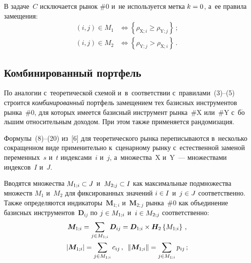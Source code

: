 \begin{multicols}{2}
  В задаче~$C$ исключается рынок \#0 и~не используется метка $k\hm = 0$, 
а~ее правила замещения: 
  \begin{align*}
  (i,j)\in M_1 &\Leftrightarrow \left\{ \rho_{\mathrm{X};i}\geq 
\rho_{\mathrm{Y};j}\right\}\,;\\
  (i,j) \in M_2 &\Leftrightarrow \left\{ \rho_{\mathrm{Y};j}> 
\rho_{\mathrm{X};i}\right\}\,.
  \end{align*}
  
  \subsection{Комбинированный портфель }
  
  По аналогии с~теоретической схемой и~в~соответствии с~правилами~(3)--(5) 
строится \textit{комбинированный} портфель замещением тех базисных 
инструментов рынка~\#0, для которых имеется базисный инструмент 
рынка~\#X или~\#Y с~б$\acute{\mbox{о}}$льшим относительным доходом. При 
этом также применяется рандомизация. 
  
  Формулы~(8)--(20) из~[6] для теоретического рынка переписываются 
в~несколько сокращенном виде применительно к~сценарному рынку 
с~естественной заменой переменных~$s$ и~$t$ индексами~$i$ и~$j$, 
а~множества~{\sf X} и~{\sf Y}~--- множествами индексов~$I$ и~$J$. 
  
  Вводятся множества $M_{1;i}\hm\subset J$ 
  и~$M_{2;j}\hm\subset I$ как максимальные 
подмножества множеств $M_1$ и~$M_2$ для фиксированных значений 
$i\hm\in I$ и~$j \hm\in J$ соответственно. Также определяются 
индикаторы~$\boldsymbol{M}_{1;i}$ и~$\boldsymbol{M}_{2;j}$ рынка~\#0 как 
объединение базисных инструментов~$\boldsymbol{D}_{ij}$ по $j \hm\in M_{1;i}$ 
и~$i\hm\in M_{2;j}$ соответственно: 
  \begin{multline}
   \boldsymbol{M}_{1;i}= \sum\limits_{j\in 
M_{1;i}}\boldsymbol{D}_{ij}=\boldsymbol{D}_{1;i}\times 
\boldsymbol{H}_2\left\{ M_{1;i}\right\}\,,\\
  \left\vert \boldsymbol{M}_{1;i}\right\vert = \sum\limits_{j\in M_{1;i}} 
c_{ij}\,,\enskip  \left\| \boldsymbol{M}_{1;i}\right\| =\sum\limits_{j\in M_{1;i}} 
p_{ij}\,;
  \label{e9-ags}
\end{multline}


\end{multicols}
